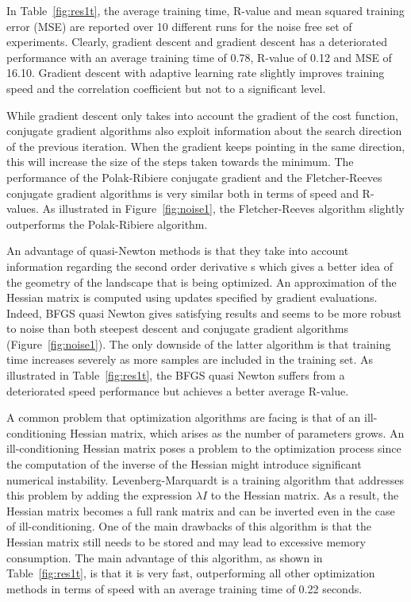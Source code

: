 \documentclass[conference,compsoc]{IEEEtran}
\begin{document}
 In Table~\ref{fig:res1t}, the average training time, R-value and mean squared training error (MSE) are reported over 10 different runs for the noise free set of experiments. Clearly, gradient descent and gradient descent has a deteriorated performance with an average training time of 0.78, R-value of 0.12 and MSE of 16.10. Gradient descent with adaptive learning rate slightly improves training speed and the correlation coefficient but not to a significant level. 

While gradient descent only takes into account the gradient of the cost function, conjugate gradient algorithms also exploit information about the search direction of the previous iteration. When the gradient keeps pointing in the same direction, this will increase the size of the steps taken towards the minimum. The performance of the Polak-Ribiere conjugate gradient and the Fletcher-Reeves conjugate gradient algorithms is very similar both in terms of speed and R-values. As illustrated in Figure~\ref{fig:noise1}, the Fletcher-Reeves algorithm slightly outperforms the Polak-Ribiere algorithm.

An advantage of quasi-Newton methods is that they take into account information regarding the second order derivative
s which  gives a better idea of the geometry of the landscape that is being optimized. An approximation of the Hessian matrix is computed using updates specified by gradient evaluations. Indeed, BFGS quasi Newton gives satisfying results and seems to be more robust to noise than both steepest descent and conjugate gradient algorithms (Figure~\ref{fig:noise1}). The only downside of the latter algorithm is that training time increases severely as more samples are included in the training set. As illustrated in Table~\ref{fig:res1t}, the BFGS quasi Newton suffers from a deteriorated speed performance but achieves a better average R-value.

A common problem that optimization algorithms are facing is that of an ill-conditioning Hessian matrix, which arises as the number of parameters grows. An ill-conditioning Hessian matrix poses a problem to the optimization process since the computation of the inverse of the Hessian might introduce significant numerical instability. Levenberg-Marquardt is a training algorithm that addresses this problem by adding the expression $\lambda I$ to the Hessian matrix. As a result, the Hessian matrix becomes a full rank matrix and can be inverted even in the case of ill-conditioning. One of the main drawbacks of this algorithm is that the Hessian matrix still needs to be stored and may lead to excessive memory consumption. The main advantage of this algorithm, as shown in Table~\ref{fig:res1t}, is that it is very fast, outperforming all other optimization methods in terms of speed with an average training time of 0.22 seconds.
\end{document}
